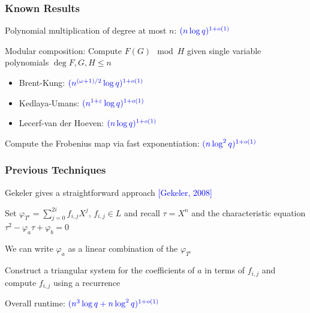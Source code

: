 \documentclass{beamer}
\newcommand{\blue}{\textcolor{blue}}
\newcommand{\spa}{\vspace{0.2cm}}
\begin{document}




\begin{frame}
\frametitle{Known Results}

Polynomial multiplication of degree at most $n$: $\blue{(n\log q)^{1 + o(1)}}$

\spa

Modular composition: Compute $F(G) \mod H$ given single variable polynomials $\deg F, G,H \leq n$
\begin{itemize}
\item Brent-Kung: $\blue{(n^{(\omega+1)/2}
\log q)^{1+o(1)}}$
    \item Kedlaya-Umans: $\blue{(n^{1 + \varepsilon}
\log q)^{1+o(1)}}$
    \item Lecerf-van der Hoeven: $\blue{(n
\log q)^{1+o(1)}}$
\end{itemize}



\spa

Compute the Frobenius map via fast exponentiation: $\blue{(n\log^2 q)^{1 + o(1)}}$ 
    


\end{frame}





\begin{frame}
\frametitle{Previous Techniques}


     Gekeler gives a straightforward approach \blue{[Gekeler, 2008]}
     
     \spa
     
    Set $\varphi_{T^i} = \sum_{j=0}^{2i}f_{i,j} X^j$, $f_{i,j} \in L$ and recall $\tau = X^n$ and the characteristic equation $\tau^2 - \varphi_a\tau + \varphi_b = 0$
    
    \spa
    
    We can write $\varphi_a$ as a linear combination of the $\varphi_{T^i}$
    
    \spa
    
     Construct a triangular system for the coefficients of $a$ in terms of $f_{i,j}$ and compute $f_{i,j}$ using a recurrence
     
     \spa
     Overall runtime: $\blue{(n^3 \log q + n\log^2 q)^{1 + o(1)}}$



\end{frame}
\end{document}
